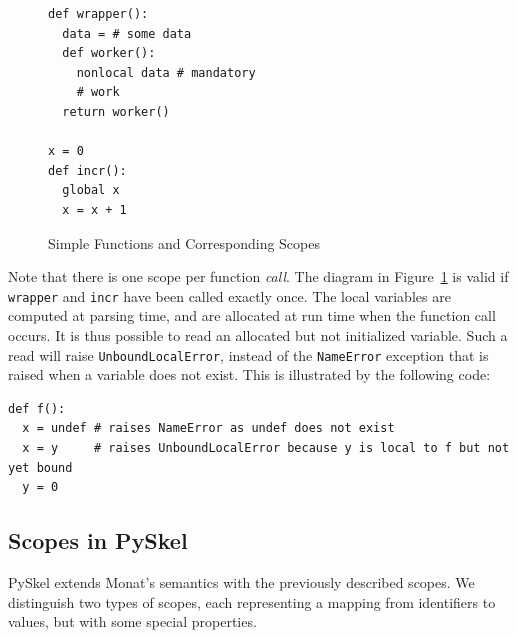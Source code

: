 \documentclass[submission,copyright,creativecommons]{eptcs}
\begin{document}
\begin{figure}[ht!]
  \begin{minipage}{0.35\textwidth}
  \begin{verbatim}
def wrapper():
  data = # some data
  def worker():
    nonlocal data # mandatory
    # work
  return worker()

x = 0
def incr():
  global x
  x = x + 1
  \end{verbatim}
  \end{minipage}
  \begin{minipage}{0.6\textwidth}
  \end{minipage}
  \caption{\label{fig:functionscope}Simple Functions and Corresponding Scopes}
\end{figure}

Note that there is one scope per function \emph{call}.
The diagram in Figure~\ref{fig:functionscope} is valid if \texttt{wrapper} and \texttt{incr} have been called exactly once.
The local variables are computed at parsing time, and are allocated at run time when the function call occurs.
It is thus possible to read an allocated but not initialized variable.
Such a read will raise \texttt{UnboundLocalError}, instead of the
\texttt{NameError} exception that is raised when a
variable does not exist. This is illustrated by the following code:
\begin{verbatim}
def f():
  x = undef # raises NameError as undef does not exist
  x = y     # raises UnboundLocalError because y is local to f but not yet bound
  y = 0
\end{verbatim}

\subsection{Scopes in PySkel}
PySkel extends Monat's semantics with the previously described scopes.
We distinguish two types of scopes, each representing a mapping from identifiers to values, but with some special properties.
\end{document}
